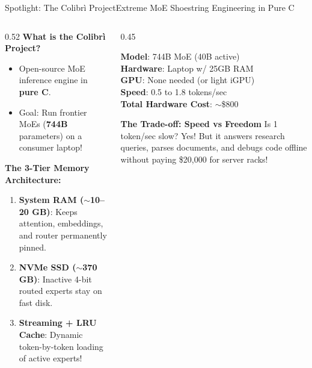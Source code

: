 \documentclass[10pt,aspectratio=169]{beamer}
\begin{document}
\begin{frame}{Spotlight: The Colibr\`i Project}{Extreme MoE Shoestring Engineering in Pure C}
    \begin{columns}[T]
        \begin{column}{0.52\textwidth}
            \textbf{What is the Colibr\`i Project?}
            \begin{itemize}\small
                \item Open-source MoE inference engine in \textbf{pure C}.
                \item Goal: Run frontier MoEs (\textbf{744B} parameters) on a consumer laptop!
            \end{itemize}
            \vspace{0.1cm}
            \textbf{The 3-Tier Memory Architecture:}
            \begin{enumerate}\small
                \item \textbf{System RAM ($\sim$10--20 GB)}: Keeps attention, embeddings, and router permanently pinned.
                \item \textbf{NVMe SSD ($\sim$370 GB)}: Inactive 4-bit routed experts stay on fast disk.
                \item \textbf{Streaming + LRU Cache}: Dynamic token-by-token loading of active experts!
            \end{enumerate}
        \end{column}
        \begin{column}{0.45\textwidth}
            \begin{tcolorbox}[colback=ShoePrimary!10, colframe=ShoePrimary, title=\textbf{Colibr\`i Hardware Stats}]
                \small
                \textbf{Model}: 744B MoE (40B active)\\
                \textbf{Hardware}: Laptop w/ 25GB RAM\\
                \textbf{GPU}: None needed (or light iGPU)\\
                \textbf{Speed}: 0.5 to 1.8 tokens/sec\\
                \textbf{Total Hardware Cost}: $\sim$\$800
            \end{tcolorbox}
            \vspace{0.2cm}
            \begin{alertblock}{\textbf{The Trade-off: Speed vs Freedom}}
                \scriptsize
                Is 1 token/sec slow? Yes! But it answers research queries, parses documents, and debugs code offline without paying \$20,000 for server racks!
            \end{alertblock}
        \end{column}
    \end{columns}
\end{frame}
\end{document}
